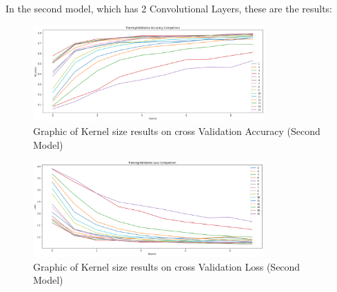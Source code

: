 \documentclass[conference]{IEEEtran}
\begin{document}
In the second model, which has 2 Convolutional Layers, these are the results:

\begin{figure}[H]
    \centering
    \includegraphics[width=3.5in]{pictures/kernel_size_accuracy.png}
    \caption{Graphic of Kernel size results on cross Validation Accuracy (Second Model)}\label{fig:example4}
\end{figure}

\begin{figure}[H]
    \centering
    \includegraphics[width=3.5in]{pictures/kernel_size_loss.png}
    \caption{Graphic of Kernel size results on cross Validation Loss (Second Model)}\label{fig:example4}
\end{figure}
\end{document}
